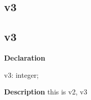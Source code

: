 \documentclass{report}
\newif\ifpdf
\begin{document}
\subsection*{\large{\textbf{v3}}\normalsize\hspace{1ex}\hrulefill}
\else
\subsection*{v3}
\fi
\label{test-v3}
\begin{list}{}{
\setlength{\itemindent}{0cm}
\setlength{\listparindent}{0cm}
\setlength{\leftmargin}{\evensidemargin}
\addtolength{\leftmargin}{\tmplength}
\settowidth{\labelsep}{X}
\addtolength{\leftmargin}{\labelsep}
\setlength{\labelwidth}{\tmplength}
}
\item[\textbf{Declaration}\hfill]
\ifpdf
\begin{flushleft}
\fi
\begin{ttfamily}
v3: integer;\end{ttfamily}

\ifpdf
\end{flushleft}
\fi

\par
\item[\textbf{Description}]
this is v2, v3

\end{list}
\end{document}
